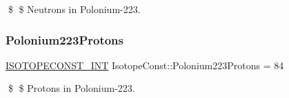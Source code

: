 \$ \$ Neutrons in Polonium-\/223. \mbox{\label{group___isotope_const-_polonium-_po223_ga0f21afcf499ab4fa94fd8cbc5697de4d}} 
\subsubsection{\texorpdfstring{Polonium223\+Protons}{Polonium223Protons}}
{\footnotesize\ttfamily \mbox{\hyperlink{group___isotope_const-_macros_ga5f18360b3e99483a35c32d789e62621c}{I\+S\+O\+T\+O\+P\+E\+C\+O\+N\+S\+T\+\_\+\+I\+NT}} Isotope\+Const\+::\+Polonium223\+Protons = 84}

\$ \$ Protons in Polonium-\/223. 